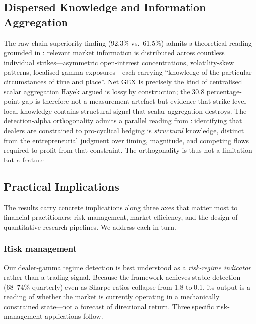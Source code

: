 \subsection{Dispersed Knowledge and Information Aggregation}

The raw-chain superiority finding (92.3\% vs.\ 61.5\%) admits a theoretical reading grounded in \citet{hayek1945}: relevant market information is distributed across countless individual strikes---asymmetric open-interest concentrations, volatility-skew patterns, localised gamma exposures---each carrying ``knowledge of the particular circumstances of time and place''. Net GEX is precisely the kind of centralised scalar aggregation Hayek argued is lossy by construction; the 30.8 percentage-point gap is therefore not a measurement artefact but evidence that strike-level local knowledge contains structural signal that scalar aggregation destroys. The detection-alpha orthogonality admits a parallel reading from \citet{kirzner1973competition}: identifying that dealers are constrained to pro-cyclical hedging is \textit{structural} knowledge, distinct from the entrepreneurial judgment over timing, magnitude, and competing flows required to profit from that constraint. The orthogonality is thus not a limitation but a feature.

\subsection{Practical Implications}
\label{sec:discussion:practical}

The results carry concrete implications along three axes that matter
most to financial practitioners: risk management, market efficiency,
and the design of quantitative research pipelines. We address each in
turn.

\subsubsection{Risk management}

Our dealer-gamma regime detection is best understood as a
\textit{risk-regime indicator} rather than a trading signal. Because
the framework achieves stable detection (68--74\% quarterly) even as
Sharpe ratios collapse from 1.8 to 0.1, its output is a reading of
whether the market is currently operating in a mechanically constrained
state---not a forecast of directional return. Three specific risk-management
applications follow.

